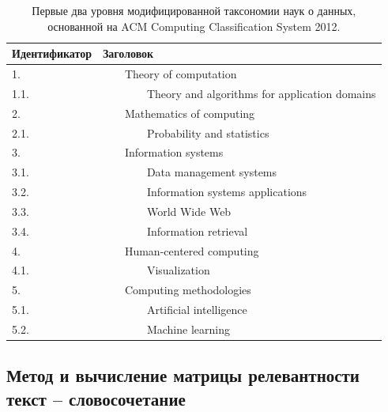 \documentclass[12pt]{article}
\let\oldsubsection\subsection
\renewcommand{\subsection}{\clearpage\oldsubsection}
\begin{document}
\begin{table}
	\def\arraystretch{1.}
	\centering
	\begin{tabular}{|l|l|}
		\hline
		Идентификатор & Заголовок                                             \\
		\hline
		1.             & ~~~~Theory of computation                             \\
		1.1.           & ~~~~~~~~Theory and algorithms for application domains \\
		2.             & ~~~~Mathematics of computing                          \\
		2.1.           & ~~~~~~~~Probability and statistics                    \\
		3.             & ~~~~Information systems                               \\
		3.1.           & ~~~~~~~~Data management systems                       \\
		3.2.           & ~~~~~~~~Information systems applications              \\
		3.3.           & ~~~~~~~~World Wide Web                                \\
		3.4.           & ~~~~~~~~Information retrieval                         \\
		4.             & ~~~~Human-centered computing                          \\
		4.1.           & ~~~~~~~~Visualization                                 \\
		5.             & ~~~~Computing methodologies                           \\
		5.1.           & ~~~~~~~~Artificial intelligence                       \\
		5.2.           & ~~~~~~~~Machine learning                              \\
		\hline
	\end{tabular}
	\label{table:acm_higher_ranks}
	\caption{Первые два уровня модифицированной таксономии наук о данных, основанной на ACM Computing Classification System 2012.}
\end{table}

	
\subsection{Метод и вычисление матрицы релевантности текст -- словосочетание}
\end{document}
